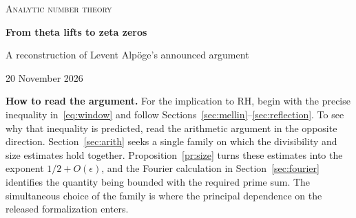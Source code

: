 \documentclass[11pt,a4paper]{article}
\theoremstyle{definition}\newtheorem{arithinput}[theorem]{Arithmetic input}
\begin{document}
\thispagestyle{plain}
\begin{center}
{\small\scshape Analytic number theory}\par\vspace{8pt}
{\LARGE\bfseries From theta lifts to zeta zeros}\par\vspace{6pt}
{\large A reconstruction of Levent Alpöge's announced argument}\par\vspace{9pt}
{\small 20 November 2026}
\end{center}
\begin{abstract}
Alpöge's argument approaches the Riemann hypothesis through a one-sided estimate for a smoothed von Mangoldt sum. The estimate is needed only on arbitrarily distant intervals $[Y,Y^{3/2}]$. We prove that this suffices, by localizing high derivatives of a Mellin transform on one such interval and comparing them with the contribution of a single pole. On the arithmetic side we derive the finite Fourier identity, the square-root exponent from the length of a chain of lifts, and the passage from a bound on each translate to the required prime-sum estimate. We identify the remaining arithmetic construction in the released Lean source, including its Selmer-length and covolume bounds. Those inputs are cited, and their full proofs have not been reconstructed here. The resulting proof of RH in this article is conditional on that construction.
\end{abstract}
\tableofcontents
\vspace{1.25em}
\noindent\textbf{How to read the argument.}
For the implication to RH, begin with the precise inequality in~\eqref{eq:window} and follow Sections~\ref{sec:mellin}--\ref{sec:reflection}. To see why that inequality is predicted, read the arithmetic argument in the opposite direction. Section~\ref{sec:arith} seeks a single family on which the divisibility and size estimates hold together. Proposition~\ref{pr:size} turns these estimates into the exponent $1/2+O(\epsilon)$, and the Fourier calculation in Section~\ref{sec:fourier} identifies the quantity being bounded with the required prime sum. The simultaneous choice of the family is where the principal dependence on the released formalization enters.
\clearpage
\end{document}
